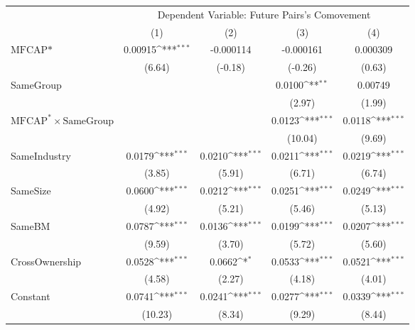 {
\def\sym#1{\ifmmode^{#1}\else\(^{#1}\)\fi}
\begin{tabular}{l*{4}{c}}
\hline\hline
                &\multicolumn{4}{c}{Dependent Variable:  Future Pairs's Comovement}         \\\cmidrule(lr){2-5}
                &\multicolumn{1}{c}{(1)}         &\multicolumn{1}{c}{(2)}         &\multicolumn{1}{c}{(3)}         &\multicolumn{1}{c}{(4)}         \\
\hline
$ \text{MFCAP*} $&  0.00915\sym{***}&-0.000114         &-0.000161         & 0.000309         \\
                &   (6.64)         &  (-0.18)         &  (-0.26)         &   (0.63)         \\
[1em]
SameGroup       &                  &                  &   0.0100\sym{**} &  0.00749         \\
                &                  &                  &   (2.97)         &   (1.99)         \\
[1em]
 $ \text{MFCAP}^* \times {\text{SameGroup} }  $ &                  &                  &   0.0123\sym{***}&   0.0118\sym{***}\\
                &                  &                  &  (10.04)         &   (9.69)         \\
[1em]
SameIndustry    &   0.0179\sym{***}&   0.0210\sym{***}&   0.0211\sym{***}&   0.0219\sym{***}\\
                &   (3.85)         &   (5.91)         &   (6.71)         &   (6.74)         \\
[1em]
SameSize        &   0.0600\sym{***}&   0.0212\sym{***}&   0.0251\sym{***}&   0.0249\sym{***}\\
                &   (4.92)         &   (5.21)         &   (5.46)         &   (5.13)         \\
[1em]
SameBM          &   0.0787\sym{***}&   0.0136\sym{***}&   0.0199\sym{***}&   0.0207\sym{***}\\
                &   (9.59)         &   (3.70)         &   (5.72)         &   (5.60)         \\
[1em]
CrossOwnership  &   0.0528\sym{***}&   0.0662\sym{*}  &   0.0533\sym{***}&   0.0521\sym{***}\\
                &   (4.58)         &   (2.27)         &   (4.18)         &   (4.01)         \\
[1em]
Constant        &   0.0741\sym{***}&   0.0241\sym{***}&   0.0277\sym{***}&   0.0339\sym{***}\\
                &  (10.23)         &   (8.34)         &   (9.29)         &   (8.44)         \\

\end{tabular}}
